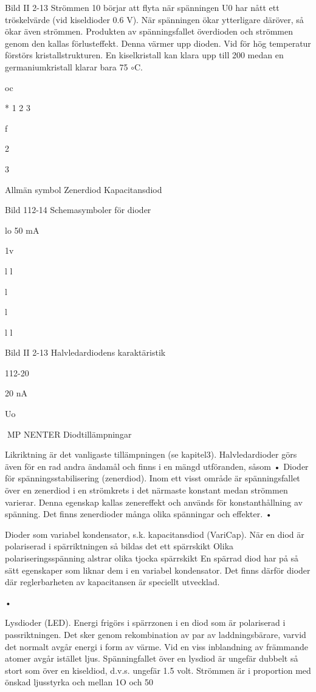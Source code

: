 {Bild II 2-13
Strömmen 10 börjar att flyta när spänningen U0 har nått ett tröskelvärde (vid kiseldioder 0.6 V). När spänningen ökar ytterligare däröver, så ökar även strömmen.
Produkten av spänningsfallet överdioden
och strömmen genom den kallas förlusteffekt. Denna värmer upp dioden. Vid för hög
temperatur förstörs kristallstrukturen. En kiselkristall kan klara upp till 200
medan en
germaniumkristall klarar bara 75 $\circ$C.

oc

*
1
2
3

f

2

3

Allmän symbol
Zenerdiod
Kapacitansdiod

Bild 112-14 Schemasymboler för dioder

lo
50 mA

1v

l
l

l

l

l
l

Bild II 2-13 Halvledardiodens karaktäristik

112-20

20 nA

Uo

MP NENTER
Diodtillämpningar

Likriktning är det vanligaste tillämpningen
(se kapitel3). Halvledardioder görs även för
en rad andra ändamål och finns i en mängd
utföranden, såsom
• Dioder för spänningsstabilisering (zenerdiod).
Inom ett visst område är spänningsfallet
över en zenerdiod i en strömkrets i det
närmaste konstant medan strömmen varierar. Denna egenskap kallas zenereffekt
och används för konstanthållning av spänning.
Det finns zenerdioder
många olika
spänningar och effekter.
•

Dioder som variabel kondensator, s.k.
kapacitansdiod (VariCap).
När en diod är polariserad i spärriktningen så bildas det ett spärrskikt Olika polariseringsspänning alstrar olika tjocka
spärrskikt En spärrad diod har på så sätt
egenskaper som liknar dem i en variabel
kondensator. Det finns därför dioder där
reglerbarheten av kapacitansen är speciellt utvecklad.

•

Lysdioder (LED).
Energi frigörs i spärrzonen i en diod som
är polariserad i passriktningen. Det sker
genom rekombination av par av laddningsbärare, varvid det normalt avgår
energi i form av värme.
Vid en viss inblandning av främmande
atomer avgår istället ljus. Spänningfallet
över en lysdiod är ungefär dubbelt så
stort som över en kiseldiod, d.v.s. ungefär 1.5 volt. Strömmen är i proportion med
önskad ljusstyrka och mellan 1O och 50

}

